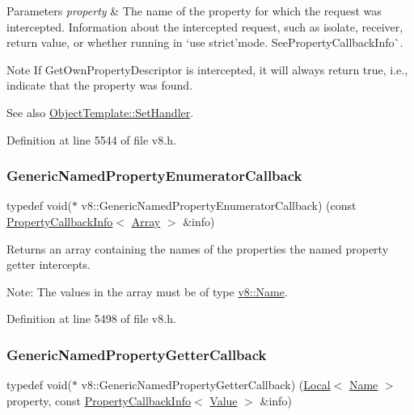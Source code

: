 \begin{DoxyParams}{Parameters}
{\em property} & The name of the property for which the request was intercepted.  Information about the intercepted request, such as isolate, receiver, return value, or whether running in `\textquotesingle{}use strict'{\ttfamily mode. See}Property\+Callback\+Info\`{}.\\
\hline
\end{DoxyParams}
\begin{DoxyNote}{Note}
If Get\+Own\+Property\+Descriptor is intercepted, it will always return true, i.\+e., indicate that the property was found.
\end{DoxyNote}
See also {\ttfamily \mbox{\hyperlink{classv8_1_1ObjectTemplate_a3d5666f1e9b0f46df6b4dbb7cfbb6114}{Object\+Template\+::\+Set\+Handler}}}. 

Definition at line 5544 of file v8.\+h.

\mbox{\label{namespacev8_a20826eb7e52e84fa4f632534e8eddd04}} 
\subsubsection{\texorpdfstring{Generic\+Named\+Property\+Enumerator\+Callback}{GenericNamedPropertyEnumeratorCallback}}
{\footnotesize\ttfamily typedef void($\ast$ v8\+::\+Generic\+Named\+Property\+Enumerator\+Callback) (const \mbox{\hyperlink{classv8_1_1PropertyCallbackInfo}{Property\+Callback\+Info}}$<$ \mbox{\hyperlink{classv8_1_1Array}{Array}} $>$ \&info)}

Returns an array containing the names of the properties the named property getter intercepts.

Note\+: The values in the array must be of type \mbox{\hyperlink{classv8_1_1Name}{v8\+::\+Name}}. 

Definition at line 5498 of file v8.\+h.

\mbox{\label{namespacev8_a24b1801fa53a7c5a71366d8044927563}} 
\subsubsection{\texorpdfstring{Generic\+Named\+Property\+Getter\+Callback}{GenericNamedPropertyGetterCallback}}
{\footnotesize\ttfamily typedef void($\ast$ v8\+::\+Generic\+Named\+Property\+Getter\+Callback) (\mbox{\hyperlink{classv8_1_1Local}{Local}}$<$ \mbox{\hyperlink{classv8_1_1Name}{Name}} $>$ property, const \mbox{\hyperlink{classv8_1_1PropertyCallbackInfo}{Property\+Callback\+Info}}$<$ \mbox{\hyperlink{classv8_1_1Value}{Value}} $>$ \&info)}

